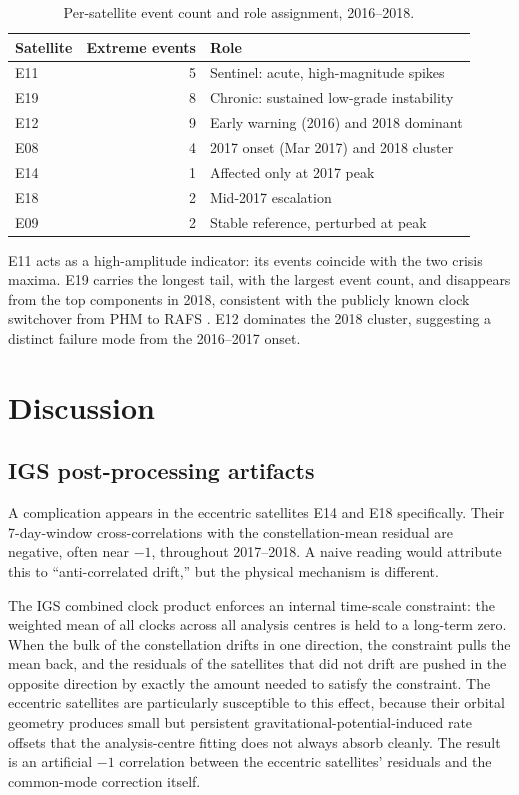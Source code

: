 \documentclass[11pt,a4paper]{article}
\begin{document}
\begin{table}[h]
    \centering
    \caption{Per-satellite event count and role assignment, 2016--2018.}
    \label{tab:roles}
    \begin{tabular}{lrl}
        \toprule
        Satellite & Extreme events & Role \\
        \midrule
        E11 & 5 & Sentinel: acute, high-magnitude spikes \\
        E19 & 8 & Chronic: sustained low-grade instability \\
        E12 & 9 & Early warning (2016) and 2018 dominant \\
        E08 & 4 & 2017 onset (Mar 2017) and 2018 cluster \\
        E14 & 1 & Affected only at 2017 peak \\
        E18 & 2 & Mid-2017 escalation \\
        E09 & 2 & Stable reference, perturbed at peak \\
        \bottomrule
    \end{tabular}
\end{table}

E11 acts as a high-amplitude indicator: its events coincide with the two crisis maxima. E19 carries the longest tail, with the largest event count, and disappears from the top components in 2018, consistent with the publicly known clock switchover from PHM to RAFS \citep{Wang2020}. E12 dominates the 2018 cluster, suggesting a distinct failure mode from the 2016--2017 onset.

\section{Discussion}

\subsection{IGS post-processing artifacts}
\label{sec:artifacts}

A complication appears in the eccentric satellites E14 and E18 specifically. Their 7-day-window cross-correlations with the constellation-mean residual are negative, often near $-1$, throughout 2017--2018. A naive reading would attribute this to ``anti-correlated drift,'' but the physical mechanism is different.

The IGS combined clock product enforces an internal time-scale constraint: the weighted mean of all clocks across all analysis centres is held to a long-term zero. When the bulk of the constellation drifts in one direction, the constraint pulls the mean back, and the residuals of the satellites that did not drift are pushed in the opposite direction by exactly the amount needed to satisfy the constraint. The eccentric satellites are particularly susceptible to this effect, because their orbital geometry produces small but persistent gravitational-potential-induced rate offsets that the analysis-centre fitting does not always absorb cleanly. The result is an artificial $-1$ correlation between the eccentric satellites' residuals and the common-mode correction itself.
\end{document}
